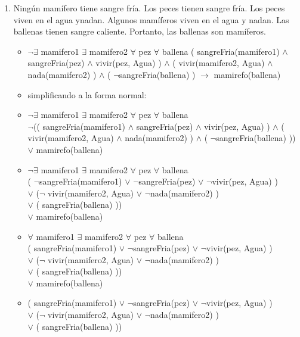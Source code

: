 \documentclass[a4paper,10pt]{article}
\begin{document}
\begin{enumerate}
\begin{itemize}
	\end{itemize}
	\item Ningún mamífero tiene sangre fría. Los peces tienen sangre fría. Los peces viven en el agua ynadan. Algunos mamíferos viven en el agua y nadan. Las ballenas tienen sangre caliente. Portanto, las ballenas son mamíferos.
	\begin{itemize}
		\item $\lnot$$\exists$ mamifero1 $\exists$ mamifero2 $\forall$ pez $\forall$ ballena ( sangreFria(mamifero1) $\land$ sangreFria(pez) $\land$ vivir(pez, Agua) ) $\land$ ( vivir(mamifero2, Agua) $\land$ nada(mamifero2) ) $\land$ ( $\lnot$sangreFria(ballena) ) $\rightarrow$ mamirefo(ballena)
		\item simplificando a la forma normal:
		\item $\lnot$$\exists$ mamifero1 $\exists$ mamifero2 $\forall$ pez $\forall$ ballena\\
		$\lnot$(( sangreFria(mamifero1) $\land$ sangreFria(pez) $\land$ vivir(pez, Agua) ) $\land$ ( vivir(mamifero2, Agua) $\land$ nada(mamifero2) ) $\land$ ( $\lnot$sangreFria(ballena) )) $\lor$ mamirefo(ballena)
		\item $\lnot$$\exists$ mamifero1 $\exists$ mamifero2 $\forall$ pez $\forall$ ballena\\
		( $\lnot$sangreFria(mamifero1) $\lor$ $\lnot$sangreFria(pez) $\lor$ $\lnot$vivir(pez, Agua) )\\
		$\lor$ ($\lnot$ vivir(mamifero2, Agua) $\lor$ $\lnot$nada(mamifero2) )\\
		$\lor$ ( sangreFria(ballena) ))\\
		$\lor$ mamirefo(ballena)\\
		\item $\forall$ mamifero1 $\exists$ mamifero2 $\forall$ pez $\forall$ ballena\\
		( sangreFria(mamifero1) $\lor$ $\lnot$sangreFria(pez) $\lor$ $\lnot$vivir(pez, Agua) )\\
		$\lor$ ($\lnot$ vivir(mamifero2, Agua) $\lor$ $\lnot$nada(mamifero2) )\\
		$\lor$ ( sangreFria(ballena) ))\\
		$\lor$ mamirefo(ballena)\\
		\item ( sangreFria(mamifero1) $\lor$ $\lnot$sangreFria(pez) $\lor$ $\lnot$vivir(pez, Agua) )\\
		$\lor$ ($\lnot$ vivir(mamifero2, Agua) $\lor$ $\lnot$nada(mamifero2) )\\
		$\lor$ ( sangreFria(ballena) ))\\
$$
\end{itemize}
\end{enumerate}
\end{document}
